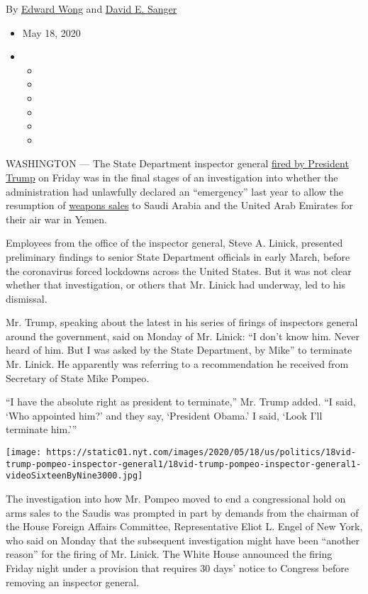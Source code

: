 By \href{https://www.nytimes.com/by/edward-wong}{Edward Wong} and
\href{https://www.nytimes.com/by/david-e-sanger}{David E. Sanger}

\begin{itemize}
\item
  May 18, 2020
\item
  \begin{itemize}
  \item
  \item
  \item
  \item
  \item
  \item
  \end{itemize}
\end{itemize}

WASHINGTON --- The State Department inspector general
\href{https://www.nytimes.com/2020/05/16/us/politics/trump-state-dept-inspector-general.html}{fired
by President Trump} on Friday was in the final stages of an
investigation into whether the administration had unlawfully declared an
``emergency'' last year to allow the resumption of
\href{https://www.nytimes.com/2020/05/16/us/arms-deals-raytheon-yemen.html}{weapons
sales} to Saudi Arabia and the United Arab Emirates for their air war in
Yemen.

Employees from the office of the inspector general, Steve A. Linick,
presented preliminary findings to senior State Department officials in
early March, before the coronavirus forced lockdowns across the United
States. But it was not clear whether that investigation, or others that
Mr. Linick had underway, led to his dismissal.

Mr. Trump, speaking about the latest in his series of firings of
inspectors general around the government, said on Monday of Mr. Linick:
``I don't know him. Never heard of him. But I was asked by the State
Department, by Mike'' to terminate Mr. Linick. He apparently was
referring to a recommendation he received from Secretary of State Mike
Pompeo.

``I have the absolute right as president to terminate,'' Mr. Trump
added. ``I said, `Who appointed him?' and they say, `President Obama.' I
said, `Look I'll terminate him.'''

\texttt{[image: https://static01.nyt.com/images/2020/05/18/us/politics/18vid-trump-pompeo-inspector-general1/18vid-trump-pompeo-inspector-general1-videoSixteenByNine3000.jpg]}

The investigation into how Mr. Pompeo moved to end a congressional hold
on arms sales to the Saudis was prompted in part by demands from the
chairman of the House Foreign Affairs Committee, Representative Eliot L.
Engel of New York, who said on Monday that the subsequent investigation
might have been ``another reason'' for the firing of Mr. Linick. The
White House announced the firing Friday night under a provision that
requires 30 days' notice to Congress before removing an inspector
general.

